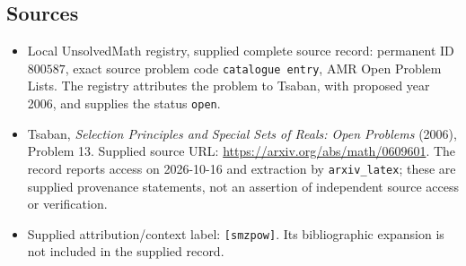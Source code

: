 \documentclass[11pt]{article}
\begin{document}
\subsection{Sources}
\begin{itemize}
\item Local UnsolvedMath registry, supplied complete source record: permanent ID \(800587\), exact source problem code \texttt{catalogue entry}, AMR Open Problem Lists. The registry attributes the problem to Tsaban, with proposed year 2006, and supplies the status \texttt{open}.
\item Tsaban, \emph{Selection Principles and Special Sets of Reals: Open Problems} (2006), Problem 13. Supplied source URL: \url{https://arxiv.org/abs/math/0609601}. The record reports access on 2026-10-16 and extraction by \texttt{arxiv\_latex}; these are supplied provenance statements, not an assertion of independent source access or verification.
\item Supplied attribution/context label: \texttt{[smzpow]}. Its bibliographic expansion is not included in the supplied record.
\end{itemize}
\end{document}
